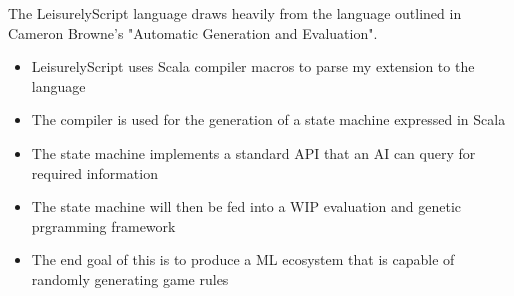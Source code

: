 \documentclass[overlapped]{res}
\begin{document}
\begin{resume}
\begin{itemize}[leftmargin=0in]
\begin{itemize}[leftmargin=0in]
\begin{samepage}
                    The LeisurelyScript language draws heavily from the language 
                    outlined in Cameron Browne's "Automatic Generation and Evaluation".
                    \begin{itemize}
                        \item[\textbullet] LeisurelyScript uses Scala compiler macros to parse my extension to the language 
                        \item[\textbullet] The compiler is used for the generation of a state machine expressed in Scala 
                        \item[\textbullet] The state machine implements a standard API that an AI can query for required information
                        \item[\textbullet] The state machine will then be fed into a WIP evaluation and genetic prgramming framework
                        \item[\textbullet] The end goal of this is to produce a ML ecosystem that is capable of randomly generating game rules

                    \end{itemize}
                \end{samepage}
\end{itemize}



\end{itemize}
\end{resume}
\end{document}

